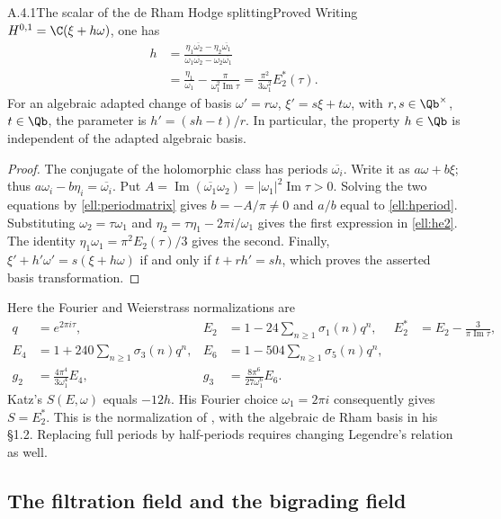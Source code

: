 \begin{result}{A.4.1}{The scalar of the de Rham Hodge splitting}{Proved}
Writing $H^{0,1}=\C(\xi+h\omega)$, one has
\begin{align}
 h&=\frac{\eta_1\overline{\omega_2}-\eta_2\overline{\omega_1}}
 {\omega_1\overline{\omega_2}-\omega_2\overline{\omega_1}}\label{ell:hperiod}\\
 &=\frac{\eta_1}{\omega_1}-\frac{\pi}{\omega_1^2\operatorname{Im}\tau}
 =\frac{\pi^2}{3\omega_1^2}E_2^*(\tau).\label{ell:he2}
\end{align}
For an algebraic adapted change of basis $\omega'=r\omega$, $\xi'=s\xi+t\omega$, with $r,s\in\Qb^\times$, $t\in\Qb$, the parameter is $h'=(sh-t)/r$. In particular, the property $h\in\Qb$ is independent of the adapted algebraic basis.
\end{result}
\begin{proof}
The conjugate of the holomorphic class has periods $\overline{\omega_i}$. Write it as $a\omega+b\xi$; thus $a\omega_i-b\eta_i=\overline{\omega_i}$. Put $A=\operatorname{Im}(\overline{\omega_1}\omega_2)=|\omega_1|^2\operatorname{Im}\tau>0$. Solving the two equations by \eqref{ell:periodmatrix} gives $b=-A/\pi\ne0$ and $a/b$ equal to \eqref{ell:hperiod}. Substituting $\omega_2=\tau\omega_1$ and $\eta_2=\tau\eta_1-2\pi i/\omega_1$ gives the first expression in \eqref{ell:he2}. The identity $\eta_1\omega_1=\pi^2 E_2(\tau)/3$ gives the second. Finally,
$\xi'+h'\omega'=s(\xi+h\omega)$ if and only if $t+rh'=sh$, which proves the asserted basis transformation.
\end{proof}

Here the Fourier and Weierstrass normalizations are
\begin{align*}
 q&=e^{2\pi i\tau},& E_2&=1-24\sum_{n\ge1}\sigma_1(n)q^n,
 &E_2^*&=E_2-\frac3{\pi\operatorname{Im}\tau},\\
 E_4&=1+240\sum_{n\ge1}\sigma_3(n)q^n,
 &E_6&=1-504\sum_{n\ge1}\sigma_5(n)q^n,\\
 g_2&=\frac{4\pi^4}{3\omega_1^4}E_4,
 &g_3&=\frac{8\pi^6}{27\omega_1^6}E_6.
\end{align*}
Katz's $S(E,\omega)$ equals $-12h$. His Fourier choice $\omega_1=2\pi i$ consequently gives $S=E_2^*$. This is the normalization of \cite[Lemma 1.3.6 and (1.3.7), p.467; (1.3.10), p.468]{EllKatz1976}, with the algebraic de Rham basis in his \S1.2. Replacing full periods by half-periods requires changing Legendre's relation as well.

\subsection{The filtration field and the bigrading field}

